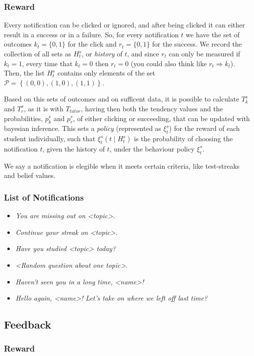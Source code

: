 \documentclass{article}
\newcommand{\0}{\mathbbold{0}}
\newcommand{\1}{\mathds{1}}
\newcommand{\2}{\mathbbold{2}}
\begin{document}
\subsubsection{Reward}
Every notification can be clicked or ignored, and after being clicked it can either result in a success or in a failure.
So, for every notification $t$ we have the set of outcomes $k_t = \{0,1\}$ for the click and $r_t = \{0,1\}$ for the success.
We record the collection of all sets as $H^s_t$, or \textsl{history} of $t$, and since $r_t$ can only be measured if $k_t = 1$, every time that $k_t = 0$ then $r_t = 0$ (you could also think like $r_t \Rightarrow k_t$).
Then, the list $H^s_t$ contains only elements of the set $\mathcal{P} = \left\{(0,0), (1,0), (1,1)\right\}$.

Based on this sets of outcomes and on sufficent data, it is possible to calculate $T^s_{k}$ and $T^s_{r}$, as it is with $T_\mathit{tutor}$, having then both the tendency values and the probabilities, $p^s_k$ and $p^s_r$, of either clicking or succeeding, that can be updated with bayesian inference.
This sets a \textsl{policy} (represented as $\xi^s_t$) for the reward of each student individually, such that $\xi^s_t\left(t \mid H^s_t\right)$ is the probability of choosing the notification $t$, given the history of $t$, under the behaviour policy $\xi^s_t$.

We say a notification is elegible when it meets certain criteria, like test-streaks and belief values.
\subsubsection{List of Notifications}
\begin{itemize}
    \item \textsl{You are missing out on <topic>}.
    \item \textsl{Continue your streak on <topic>}.
    \item \textsl{Have you studied <topic> today?}
    \item \textsl{<Random question about one topic>}.
    \item \textsl{Haven't seen you in a long time, <name>!}
    \item \textsl{Hello again, <name>! Let's take on where we left off last time?}
\end{itemize}
\subsection{Feedback}
\subsubsection{Reward}
\end{document}
